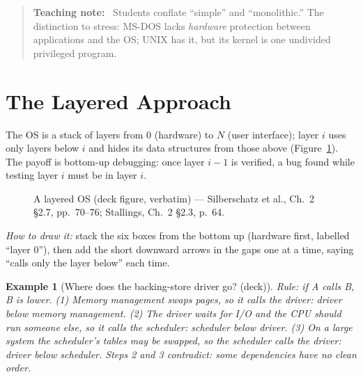 \documentclass[11pt]{article}
\newtheorem{example}{Example}[section]
\newenvironment{teachingaside}{\begin{quote}\small\color{primary-gold}\textbf{Teaching note:}\ }{\end{quote}}
\begin{document}
\begin{teachingaside}
Students conflate ``simple'' and ``monolithic.'' The distinction to stress: MS-DOS lacks \emph{hardware} protection between applications and the OS; UNIX has it, but its kernel is one undivided privileged program.
\end{teachingaside}

\section{The Layered Approach}

The OS is a stack of layers from 0 (hardware) to $N$ (user interface); layer $i$ uses only layers below $i$ and hides its data structures from those above (Figure~\ref{fig:layers}). The payoff is bottom-up debugging: once layer $i-1$ is verified, a bug found while testing layer $i$ must be in layer $i$.

\begin{figure}[h]
\centering
{}
\caption{A layered OS (deck figure, verbatim) --- Silberschatz et al., Ch.~2 \S2.7, pp.~70--76; Stallings, Ch.~2 \S2.3, p.~64.}
\label{fig:layers}
\end{figure}

\emph{How to draw it:} stack the six boxes from the bottom up (hardware first, labelled ``layer 0''), then add the short downward arrows in the gaps one at a time, saying ``calls only the layer below'' each time.

\begin{example}[Where does the backing-store driver go? (deck)]
Rule: if A calls B, B is lower. (1) Memory management swaps pages, so it calls the driver: driver below memory management. (2) The driver waits for I/O and the CPU should run someone else, so it calls the scheduler: scheduler below driver. (3) On a large system the scheduler's tables may be swapped, so the scheduler calls the driver: driver below scheduler. Steps 2 and 3 contradict: some dependencies have no clean order.
\end{example}
\end{document}
